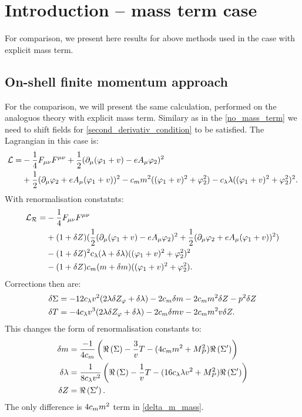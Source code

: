 \chapter{Introduction -- mass term case}
For comparison, we present here results for above methods used in the case with explicit mass term.

\section{On-shell finite momentum approach}
For the comparison, we will present the same calculation, performed on the analoguos theory with 
explicit mass term. Similary as in the \ref{no_mass_term} we need to shift fields for 
\ref{second_derivativ_condition} to be satisfied. The Lagrangian in this case is:
\begin{align}\label{mass_term_lagrangian}
\mathcal{L} = &-\frac{1}{4}F_{\mu\nu}F^{\mu\nu}+ 
\frac{1}{2}(\partial_\mu(\varphi_1+v) - eA_\mu\varphi_2)^2\\
&+\frac{1}{2}(\partial_\mu\varphi_2+eA_\mu(\varphi_1+v))^2 - c_m m^2((\varphi_1+v)^2+\varphi_2^2)
-c_\lambda\lambda((\varphi_1+v)^2+\varphi_2^2)^2. \notag
\end{align}
With renormalisation constatnts:
\begin{align}
\mathcal{L_R} = &-\frac{1}{4}F_{\mu\nu}F^{\mu\nu} \\
&+(1+ \delta Z)(\frac{1}{2}(\partial_\mu(\varphi_1+v) - eA_\mu\varphi_2)^2
+\frac{1}{2}(\partial_\mu\varphi_2+eA_\mu(\varphi_1+v))^2) \notag \\
&-(1+\delta Z)^2c_\lambda(\lambda+\delta\lambda)((\varphi_1+v)^2+\varphi_2^2)^2  \notag \\
&-(1+\delta Z)c_m(m+\delta m)((\varphi_1+v)^2+\varphi_2^2).
\end{align}
Corrections then are:
\begin{align}
\delta\Sigma&=-12c_\lambda v^2(2\lambda\delta Z_\varphi+\delta\lambda)-2c_m\delta m-2c_m m^2\delta Z -p^2\delta Z \\
\delta T&=-4c_\lambda v^3(2\lambda\delta Z_\varphi+\delta\lambda)-2c_m\delta m v-2c_m m^2v\delta Z.
\end{align}
This changes the form of renormalisation constants to:
\begin{align}
\delta m &= \frac{-1}{4c_m}\left(\Re\left(\Sigma\right)-\frac{3}{v}T-(4c_m m^2+M_P^2)\Re\left(\Sigma'\right)
\right)\label{delta_m_mass}\\
\delta\lambda &= \frac{1}{8c_\lambda v^2}\left(\Re\left(\Sigma\right)-\frac{1}{v}T-(16c_\lambda\lambda v^2+M_P^2)
\Re\left(\Sigma'\right)
\right)\\
\delta Z &= \Re\left(\Sigma'\right).
\end{align}
The only difference is $4c_m m^2$ term in \ref{delta_m_mass}. 

